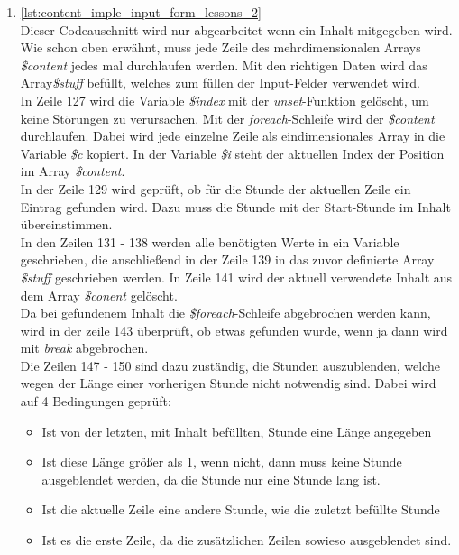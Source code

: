 \begin{enumerate}
	
	
	\item \autoref{lst:content_imple_input_form_lessons_2}\\
	Dieser Codeauschnitt wird nur abgearbeitet wenn ein Inhalt mitgegeben wird. Wie schon oben erwähnt, muss jede Zeile des mehrdimensionalen Arrays \textit{\$content} jedes mal durchlaufen werden. Mit den richtigen Daten wird das Array\textit{\$stuff} befüllt, welches zum füllen der Input-Felder verwendet wird.\\
	In Zeile 127 wird die Variable \textit{\$index} mit der \textit{unset}-Funktion gelöscht, um keine Störungen zu verursachen. Mit der \textit{foreach}-Schleife wird der \textit{\$content} durchlaufen. Dabei wird jede einzelne Zeile als eindimensionales Array in die Variable \textit{\$c} kopiert. In der Variable \textit{\$i} steht der aktuellen Index der Position im Array \textit{\$content}.\\
	In der Zeile 129 wird geprüft, ob für die Stunde der aktuellen Zeile ein Eintrag gefunden wird. Dazu muss die Stunde mit der Start-Stunde  im Inhalt übereinstimmen.\\
	In den Zeilen 131 - 138 werden alle benötigten Werte in ein Variable geschrieben, die anschließend in der Zeile 139 in das zuvor definierte Array \textit{\$stuff} geschrieben werden.  In Zeile 141 wird der aktuell verwendete Inhalt aus dem Array \textit{\$conent} gelöscht.\\ Da bei gefundenem Inhalt die \textit{\$foreach}-Schleife abgebrochen werden kann, wird in der zeile 143 überprüft, ob etwas gefunden wurde, wenn ja dann wird mit \textit{break} abgebrochen.\\
	Die Zeilen 147 - 150 sind dazu zuständig, die Stunden auszublenden, welche wegen der Länge einer vorherigen Stunde nicht notwendig sind. Dabei wird auf 4 Bedingungen geprüft:
	
	\begin{itemize}
		\item Ist von der letzten, mit Inhalt befüllten, Stunde eine Länge angegeben
		\item Ist diese Länge größer als 1, wenn nicht, dann muss keine Stunde ausgeblendet werden, da die Stunde nur eine Stunde lang ist.
		\item Ist die aktuelle Zeile eine andere Stunde, wie die zuletzt befüllte Stunde
		\item Ist es die erste Zeile, da die zusätzlichen Zeilen sowieso ausgeblendet sind.
	\end{itemize}
	

\end{enumerate}
